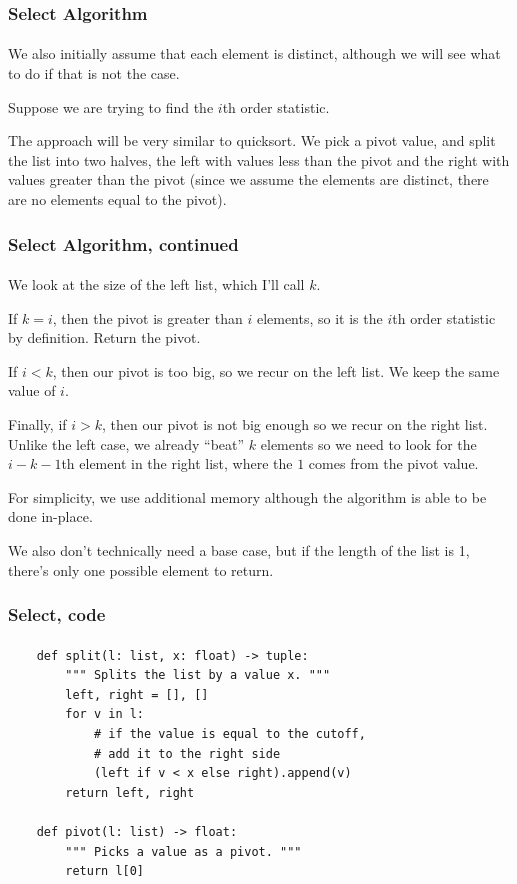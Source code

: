 \documentclass{beamer}                             %
\begin{document}
\begin{frame}
\frametitle{Select Algorithm}
\framesubtitle{}
We also initially assume that each element is distinct, although we will see
what to do if that is not the case. \pause

Suppose we are trying to find the \( i \)th order statistic.

The approach will be very similar to quicksort. We pick a pivot value, and
split the list into two halves, the left with values less than the pivot and
the right with values greater than the pivot (since we assume the elements
are distinct, there are no elements equal to the pivot). \pause
\end{frame}

\begin{frame}
\frametitle{Select Algorithm, continued}
\framesubtitle{}
We look at the size of the left list, which I'll call \( k \).

If \( k = i \), then the pivot is greater than \( i \) elements,
so it is the \( i \)th order statistic by definition. Return the pivot. \pause

If \( i < k \), then our pivot is too big, so we recur on the left list.
We keep the same value of \( i \). \pause

Finally, if \( i > k \), then our pivot is not big enough so we recur on the
right list. Unlike the left case, we already \enquote{beat} \( k \) elements
so we need to look for the \( i - k - 1 \)th element in the right list,
where the \( 1 \) comes from the pivot value.  \pause

For simplicity, we use additional memory
although the algorithm is able to be done in-place. \pause

We also don't technically need a base case, but if the length of the list is 1,
there's only one possible element to return.
\end{frame}

\begin{frame}[fragile]
\frametitle{Select, code}
\framesubtitle{}
\begin{verbatim}
    def split(l: list, x: float) -> tuple:
        """ Splits the list by a value x. """
        left, right = [], []
        for v in l:
            # if the value is equal to the cutoff,
            # add it to the right side 
            (left if v < x else right).append(v)
        return left, right

    def pivot(l: list) -> float:
        """ Picks a value as a pivot. """
        return l[0]
\end{verbatim}
\end{frame}
\end{document}

